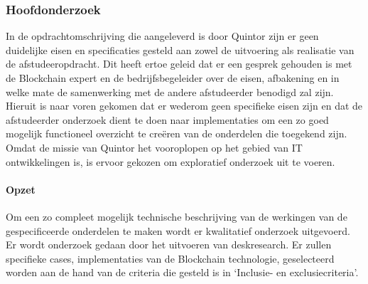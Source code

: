 \subsubsection{Hoofdonderzoek}

In de opdrachtomschrijving die aangeleverd is door Quintor zijn er geen duidelijke eisen en specificaties gesteld aan zowel de uitvoering als realisatie van de afstudeeropdracht. Dit heeft ertoe geleid dat er een gesprek gehouden is met de Blockchain expert en de bedrijfsbegeleider over de eisen, afbakening en in welke mate de samenwerking met de andere afstudeerder benodigd zal zijn. Hieruit is naar voren gekomen dat er wederom geen specifieke eisen zijn en dat de afstudeerder onderzoek dient te doen naar implementaties om een zo goed mogelijk functioneel overzicht te creëren van de onderdelen die toegekend zijn. Omdat de missie van Quintor het vooroplopen op het gebied van IT ontwikkelingen is, is ervoor gekozen om exploratief onderzoek uit te voeren.

\paragraph{Opzet}

Om een zo compleet mogelijk technische beschrijving van de werkingen van de gespecificeerde onderdelen te maken wordt er kwalitatief onderzoek uitgevoerd. Er wordt onderzoek gedaan door het uitvoeren van deskresearch. Er zullen specifieke cases, implementaties van de Blockchain technologie, geselecteerd worden aan de hand van de criteria die gesteld is in ‘Inclusie- en exclusiecriteria’.